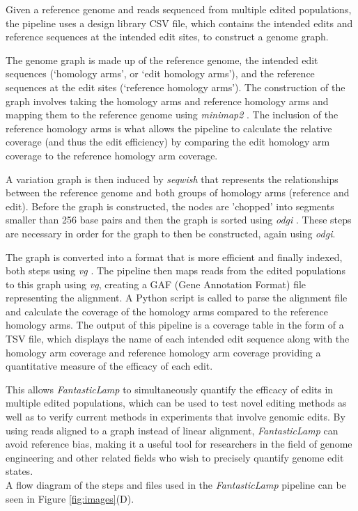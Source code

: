 \documentclass{bioinfo}
\theoremstyle{definition}
\begin{document}
Given a reference genome and reads sequenced from multiple edited populations, the pipeline uses a design library CSV file, which contains the intended edits and reference sequences at the intended edit sites, to construct a genome graph.

The genome graph is made up of the reference genome, the intended edit sequences (`homology arms', or `edit homology arms'), and the reference sequences at the edit sites (`reference homology arms').
The construction of the graph involves taking the homology arms and reference homology arms and mapping them to the reference genome using \textit{minimap2} \citep{li2018minimap2}.
The inclusion of the reference homology arms is what allows the pipeline to calculate the relative coverage (and thus the edit efficiency) by comparing the edit homology arm coverage to the reference homology arm coverage.

A variation graph is then induced by \textit{seqwish} \citep{garrison2023unbiased} that represents the relationships between the reference genome and both groups of homology arms (reference and edit).
Before the graph is constructed, the nodes are 'chopped' into segments smaller than 256 base pairs and then the graph is sorted using \textit{odgi} \citep{guarracino2022odgi}.
These steps are necessary in order for the graph to then be constructed, again using \textit{odgi}. 

The graph is converted into a format that is more efficient and finally indexed, both steps using \textit{vg} \citep{garrison2018variation}.
The pipeline then maps reads from the edited populations to this graph using \textit{vg}, creating a GAF (Gene Annotation Format) file representing the alignment.
A Python script is called to parse the alignment file and calculate the coverage of the homology arms compared to the reference homology arms.
The output of this pipeline is a coverage table in the form of a TSV file, which displays the name of each intended edit sequence along with the homology arm coverage and reference homology arm coverage providing a quantitative measure of the efficacy of each edit.
  

This allows \textit{FantasticLamp} to simultaneously quantify the efficacy of edits in multiple edited populations, which can be used to test novel editing methods as well as to verify current methods in experiments that involve genomic edits.
By using reads aligned to a graph instead of linear alignment, \textit{FantasticLamp} can avoid reference bias, making it a useful tool for researchers in the field of genome engineering and other related fields who wish to precisely quantify genome edit states.\\
A flow diagram of the steps and files used in the \textit{FantasticLamp} pipeline can be seen in Figure \ref{fig:images}(D).
\end{document}
